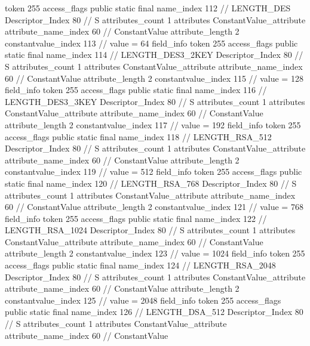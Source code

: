 {{{{{				token	255
				access_flags	public static final
				name_index	112		// LENGTH_DES
				Descriptor_Index	80		// S
				attributes_count	1
				attributes {
				ConstantValue_attribute {
					attribute_name_index	60		// ConstantValue
					attribute_length	2
					constantvalue_index	113		// value = 64
				}
				}
			}
			field_info {
				token	255
				access_flags	public static final
				name_index	114		// LENGTH_DES3_2KEY
				Descriptor_Index	80		// S
				attributes_count	1
				attributes {
				ConstantValue_attribute {
					attribute_name_index	60		// ConstantValue
					attribute_length	2
					constantvalue_index	115		// value = 128
				}
				}
			}
			field_info {
				token	255
				access_flags	public static final
				name_index	116		// LENGTH_DES3_3KEY
				Descriptor_Index	80		// S
				attributes_count	1
				attributes {
				ConstantValue_attribute {
					attribute_name_index	60		// ConstantValue
					attribute_length	2
					constantvalue_index	117		// value = 192
				}
				}
			}
			field_info {
				token	255
				access_flags	public static final
				name_index	118		// LENGTH_RSA_512
				Descriptor_Index	80		// S
				attributes_count	1
				attributes {
				ConstantValue_attribute {
					attribute_name_index	60		// ConstantValue
					attribute_length	2
					constantvalue_index	119		// value = 512
				}
				}
			}
			field_info {
				token	255
				access_flags	public static final
				name_index	120		// LENGTH_RSA_768
				Descriptor_Index	80		// S
				attributes_count	1
				attributes {
				ConstantValue_attribute {
					attribute_name_index	60		// ConstantValue
					attribute_length	2
					constantvalue_index	121		// value = 768
				}
				}
			}
			field_info {
				token	255
				access_flags	public static final
				name_index	122		// LENGTH_RSA_1024
				Descriptor_Index	80		// S
				attributes_count	1
				attributes {
				ConstantValue_attribute {
					attribute_name_index	60		// ConstantValue
					attribute_length	2
					constantvalue_index	123		// value = 1024
				}
				}
			}
			field_info {
				token	255
				access_flags	public static final
				name_index	124		// LENGTH_RSA_2048
				Descriptor_Index	80		// S
				attributes_count	1
				attributes {
				ConstantValue_attribute {
					attribute_name_index	60		// ConstantValue
					attribute_length	2
					constantvalue_index	125		// value = 2048
				}
				}
			}
			field_info {
				token	255
				access_flags	public static final
				name_index	126		// LENGTH_DSA_512
				Descriptor_Index	80		// S
				attributes_count	1
				attributes {
				ConstantValue_attribute {
					attribute_name_index	60		// ConstantValue
}}}}}}}
